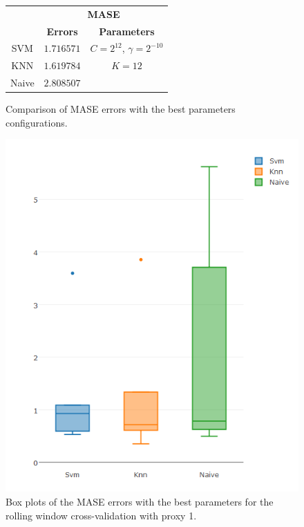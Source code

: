 \begin{figure}[!h]
\centering
\begin{tabular}{|c|c|c|}
   \hline
   & \multicolumn{2}{|c|}{\textbf{MASE}} \\ \cline{2-3}
   & \textbf{Errors} & \textbf{Parameters}          \\ \hline
   SVM  &  $1.716571$       & $C = 2^{12}$, $\gamma = 2^{-10}$ \\ 
   KNN & $1.619784$ & $K = 12$ \\ 
   Naive & $2.808507$ &      \\ 
   \hline
   \end{tabular}
\caption{Comparison of MASE errors with the best parameters configurations.}
\label{fig:table10yMASEp1}
\centering
\includegraphics[width=\linewidth]{img/10yproxy1MASE.png}
\caption{Box plots of the MASE errors with the best parameters for the rolling window cross-validation with proxy 1.}
\end{figure}